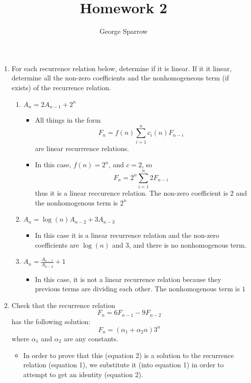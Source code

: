 \documentclass{article}
\title{Homework 2}
\date{\mydate}
\author{George Sparrow}
\begin{document}
\maketitle
\newpage

\begin{enumerate}
\item For each recurrence relation below, determine if it is linear. If it it linear, determine all the non-zero coefficients and the nonhomogeneous term (if exists) of the recurrence relation.
  \begin{enumerate}
  \item $A_{n}=2A_{n-1}+2^{n}$
    \begin{itemize}
    \item [] All things in the form $$F_{n}=f(n) \sum\limits_{i=1}^{n}c_{i}(n)F_{n-i}$$ are linear recurrrence relations.
    \item In this case, $f(n)=2^{n}$, and $c=2$, so $$F_{n}=2^{n} \sum\limits_{i=1}^{n}2F_{n-i}$$ thus it is a linear reccurence relation. The non-zero coefficient is $2$ and the nonhomogenous term is $2^{n}$
    \end{itemize}
  \item $A_{n}=\log{(n)}A_{n-2}+3A_{n-3}$
    \begin{itemize}
    \item In this case it is a linear recurrence relation and the non-zero coefficients are $\log{(n)}$ and $3$, and there is no nonhomogenous term.
    \end{itemize}
  \item {\Large $A_{n}=\frac{A_{n-1}}{A_{n-2}}+1$}
    \begin{itemize}
    \item In this case, it is not a linear recurrence relation because they previous terms are dividing each other. The nonhomogenous term is $1$
    \end{itemize}
  \end{enumerate}
\item Check that the recurrence relation
  \begin{equation}
  F_{n}=6F_{n-1}-9F_{n-2}
  \end{equation}
has the following solution:
  \begin{equation}
  F_{n}=(\alpha_{1}+\alpha_{2}n)3^{n}
  \end{equation}
where $\alpha_{1}$ and $\alpha_{2}$ are any constants.
  \begin{itemize}
  \item [] In order to prove that this (equation 2) is a solution to the recurrence relation (equation 1), we substitute it (into equation 1) in order to attempt to get an identity (equation 2).

\end{itemize}
\end{enumerate}
\end{document}
